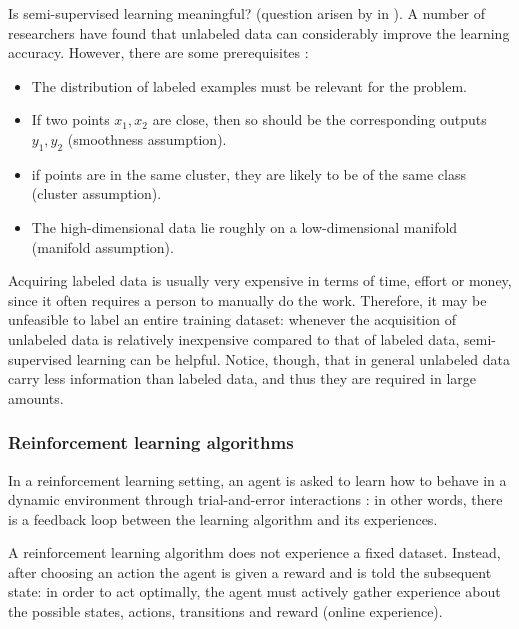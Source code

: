                 Is semi-supervised learning meaningful?  (question arisen by \citeauthor{Chapelle} in \cite[4]{Chapelle}). A number of researchers have found that unlabeled data can considerably improve the learning accuracy. However, there are some prerequisites \cite[4--7]{Chapelle}:
                \begin{itemize}
                    \item The distribution of labeled examples must be relevant for the problem.
                    \item If two points \(x_{1}, x_{2}\) are close, then so should be the corresponding outputs \(y_{1}, y_{2}\) (smoothness assumption).
                    \item if points are in the same cluster, they are likely to be of the same class (cluster assumption).
                    \item The high-dimensional data lie roughly on a low-dimensional manifold (manifold assumption).
                \end{itemize}
                
                Acquiring labeled data is usually very expensive in terms of time, effort or money, since it often requires a person to manually do the work. Therefore, it may be unfeasible to label an entire training dataset: whenever the acquisition of unlabeled data is relatively inexpensive compared to that of labeled data, semi-supervised learning can be helpful. Notice, though, that in general unlabeled data carry less information than labeled data, and thus they are required in large amounts.
            \subsubsection{Reinforcement learning algorithms}
                In a reinforcement learning setting, an agent is asked to learn how to behave in a dynamic environment through trial-and-error interactions \cite{Kaelbling}: in other words, there is a feedback loop between the learning algorithm and its experiences.
                
                A reinforcement learning algorithm does not experience a fixed dataset. Instead, after choosing an action the agent is given a reward and is told the subsequent state: in order to act optimally, the agent must actively gather experience about the possible states, actions, transitions and reward (online experience).
